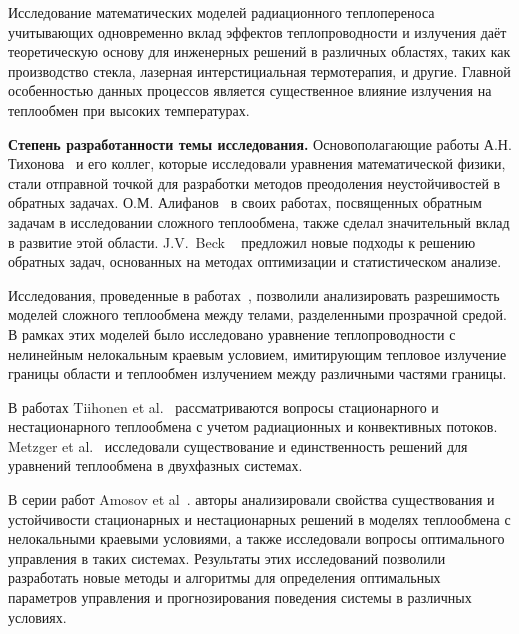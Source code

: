     Исследование математических моделей радиационного теплопереноса учитывающих одновременно
    вклад эффектов теплопроводности и излучения даёт теоретическую основу для инженерных
    решений в различных областях,
    таких как производство стекла,
    лазерная интерстициальная термотерапия, и другие.
    Главной особенностью данных процессов является существенное влияние излучения
    на теплообмен при высоких температурах.




    \textbf{Степень разработанности темы исследования.}
    Основополагающие работы А.Н. Тихонова~\cite{TikhonovSamarskii1972} и его коллег,
    которые исследовали уравнения математической физики, стали отправной точкой для
    разработки методов преодоления неустойчивостей в обратных задачах.
    О.М. Алифанов~\cite{Aliphanov2009} в своих работах, посвященных обратным задачам
    в исследовании сложного теплообмена, также сделал значительный вклад в развитие этой области.
    J.V.\ Beck ~\cite[]{Beck1985-fg} предложил новые подходы к решению обратных задач,
    основанных на методах оптимизации и статистическом анализе.


    Исследования, проведенные в работах~\cite{
        Tiihonen1997a, Tiihonen1997b, metzger1999existence, Amosov2005,
        Amosov2009, Philip2010, Amosov2016, Amosov2017,
        amosov2010stationary, druet2009weak, druet2010weak, laitinen2001conductive}, позволили анализировать разрешимость моделей сложного теплообмена между телами,
    разделенными прозрачной средой.
    В рамках этих моделей было исследовано уравнение теплопроводности
    с нелинейным нелокальным краевым условием, имитирующим тепловое излучение
    границы области и теплообмен излучением между различными частями границы.

    В работах Tiihonen et al.~\cite{Tiihonen1997a, Tiihonen1997b} рассматриваются вопросы
    стационарного и нестационарного теплообмена с учетом радиационных и конвективных потоков.
    Metzger et al.~\cite{metzger1999existence} исследовали существование и единственность
    решений для уравнений теплообмена в двухфазных системах.


    В серии работ Amosov et
    al~\cite{Amosov2005, Amosov2009, Amosov2016, Amosov2017, amosov2010stationary}.
    авторы анализировали свойства существования и устойчивости стационарных
    и нестационарных решений в моделях теплообмена с нелокальными краевыми условиями,
    а также исследовали вопросы оптимального управления в таких системах.
    Результаты этих исследований позволили разработать новые методы и алгоритмы для определения
    оптимальных параметров управления и прогнозирования поведения системы в различных условиях.

